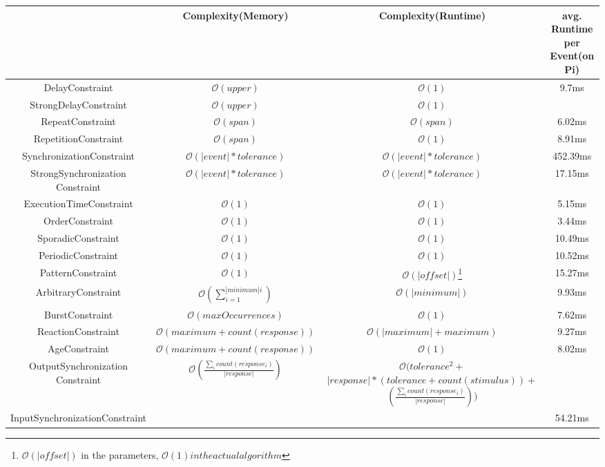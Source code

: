 	\begin{landscape}
		\begin{table}
			\begin{tabular}{|c|c|c|c|}
				\hline
				& Complexity(Memory) & Complexity(Runtime) & \makecell{avg. Runtime\\per Event(on Pi)}\\
				\hline
				DelayConstraint					&$\mathcal{O}(upper)$&$\mathcal{O}(1)$&9.7ms\\
				\hline
				StrongDelayConstraint			&$\mathcal{O}(upper)$&$\mathcal{O}(1)$&\\
				\hline
				RepeatConstraint				&$\mathcal{O}(span)$&$\mathcal{O}(span)$&6.02ms\\
				\hline
				RepetitionConstraint			&$\mathcal{O}(span)$&$\mathcal{O}(1)$&8.91ms\\
				\hline
				SynchronizationConstraint		&$\mathcal{O}(|event|*tolerance)$&$\mathcal{O}(|event|*tolerance)$&452.39ms\\
				\hline
				\makecell{StrongSynchronization\\Constraint} &$\mathcal{O}(|event|*tolerance)$&$\mathcal{O}(|event|*tolerance)$&17.15ms\\
				\hline
				ExecutionTimeConstraint			&$\mathcal{O}(1)$&$\mathcal{O}(1)$&5.15ms\\
				\hline
				OrderConstraint					&$\mathcal{O}(1)$&$\mathcal{O}(1)$&3.44ms\\
				\hline
				SporadicConstraint				&$\mathcal{O}(1)$&$\mathcal{O}(1)$&10.49ms\\
				\hline
				PeriodicConstraint				&$\mathcal{O}(1)$&$\mathcal{O}(1)$&10.52ms\\
				\hline
				PatternConstraint				&$\mathcal{O}(1)$&$\mathcal{O}(|offset|)$\footnote{$\mathcal{O}(|offset|)$ in the parameters, $\mathcal{O}(1) in the actual algorithm$}&15.27ms\\
				\hline
				ArbitraryConstraint				&$\mathcal{O}(\sum_{i=1}^{|minimum|i})$&$\mathcal{O}(|minimum|)$&9.93ms\\
				\hline
				BurstConstraint					&$\mathcal{O}(maxOccurrences)$&$\mathcal{O}(1)$&7.62ms\\
				\hline
				ReactionConstraint				&$\mathcal{O}(maximum+count(response))$&$\mathcal{O}(|maximum| + maximum)$&9.27ms\\
				\hline
				AgeConstraint					&$\mathcal{O}(maximum+count(response))$&$\mathcal{O}(1)$&8.02ms\\
				\hline
				\makecell{OutputSynchronization\\Constraint}	&$\mathcal{O}\left(\frac{\sum_i count(response_i)}{|response|}\right)$ & \makecell{ $\mathcal{O}(tolerance^2+$\\$|response|*(tolerance+count(stimulus))+$\\$\left(\frac{\sum_i count(response_i)}{|response|}\right))$}&\\
				\hline
				InputSynchronizationConstraint	&&&54.21ms\\
				\hline
			\end{tabular}
			\label{tab:evalOverview}
			\centering
		\end{table}
	\end{landscape}
	
	
	
	

	
	
